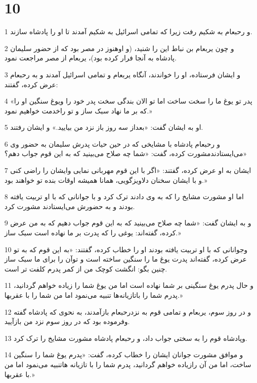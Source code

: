 \chapter{10}

\par 1 و رحبعام به شکیم رفت زیرا که تمامی اسرائیل به شکیم آمدند تا او را پادشاه سازند.
\par 2 و چون یربعام بن نباط این را شنید، (و اوهنوز در مصر بود که از حضور سلیمان پادشاه به آنجا فرار کرده بود)، یربعام از مصر مراجعت نمود.
\par 3 و ایشان فرستاده، او را خواندند، آنگاه یربعام و تمامی اسرائیل آمدند و به رحبعام عرض کرده، گفتند:
\par 4 «پدر تو یوغ ما را سخت ساخت اما تو الان بندگی سخت پدر خود را ویوغ سنگین او را که بر ما نهاد سبک ساز و تو راخدمت خواهیم نمود.»
\par 5 او به ایشان گفت: «بعداز سه روز باز نزد من بیایید.» و ایشان رفتند.
\par 6 و رحبعام پادشاه با مشایخی که در حین حیات پدرش سلیمان به حضور وی می‌ایستادندمشورت کرده، گفت: «شما چه صلاح می‌بینید که به این قوم جواب دهم؟»
\par 7 ایشان به او عرض کرده، گفتند: «اگر با این قوم مهربانی نمایی وایشان را راضی کنی و با ایشان سخنان دلاویزگویی، همانا همیشه اوقات بنده تو خواهند بود.»
\par 8 اما او مشورت مشایخ را که به وی دادند ترک کرد و با جوانانی که با او تربیت یافته بودند و به حضورش می‌ایستادند مشورت کرد.
\par 9 و به ایشان گفت: «شما چه صلاح می‌بینید که به این قوم جواب دهیم که به من عرض کرده، گفته‌اند: یوغی را که پدرت بر ما نهاده است سبک ساز.»
\par 10 وجوانانی که با او تربیت یافته بودند او را خطاب کرده، گفتند: «به این قوم که به تو عرض کرده، گفته‌اند پدرت یوغ ما را سنگین ساخته است و توآن را برای ما سبک ساز چنین بگو: انگشت کوچک من از کمر پدرم کلفت تر است.
\par 11 و حال پدرم یوغ سنگینی بر شما نهاده است اما من یوغ شما را زیاده خواهم گردانید، پدرم شما را باتازیانه‌ها تنبیه می‌نمود اما من شما را با عقربها.» 
\par 12 و در روز سوم، یربعام و تمامی قوم به نزدرحبعام بازآمدند، به نحوی که پادشاه گفته وفرموده بود که در روز سوم نزد من بازآیید.
\par 13 وپادشاه قوم را به سختی جواب داد، و رحبعام پادشاه مشورت مشایخ را ترک کرد.
\par 14 و موافق مشورت جوانان ایشان را خطاب کرده، گفت: «پدرم یوغ شما را سنگین ساخت، اما من آن رازیاده خواهم گردانید، پدرم شما را با تازیانه هاتنبیه می‌نمود اما من با عقربها.»
